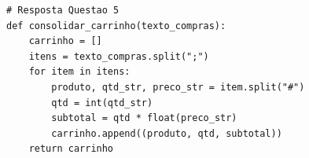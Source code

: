 \ifmostrarGabarito
\begin{verbatim}
# Resposta Questao 5
def consolidar_carrinho(texto_compras):
    carrinho = []
    itens = texto_compras.split(";")
    for item in itens:
        produto, qtd_str, preco_str = item.split("#")
        qtd = int(qtd_str)
        subtotal = qtd * float(preco_str)
        carrinho.append((produto, qtd, subtotal))
    return carrinho
\end{verbatim}
\fi
